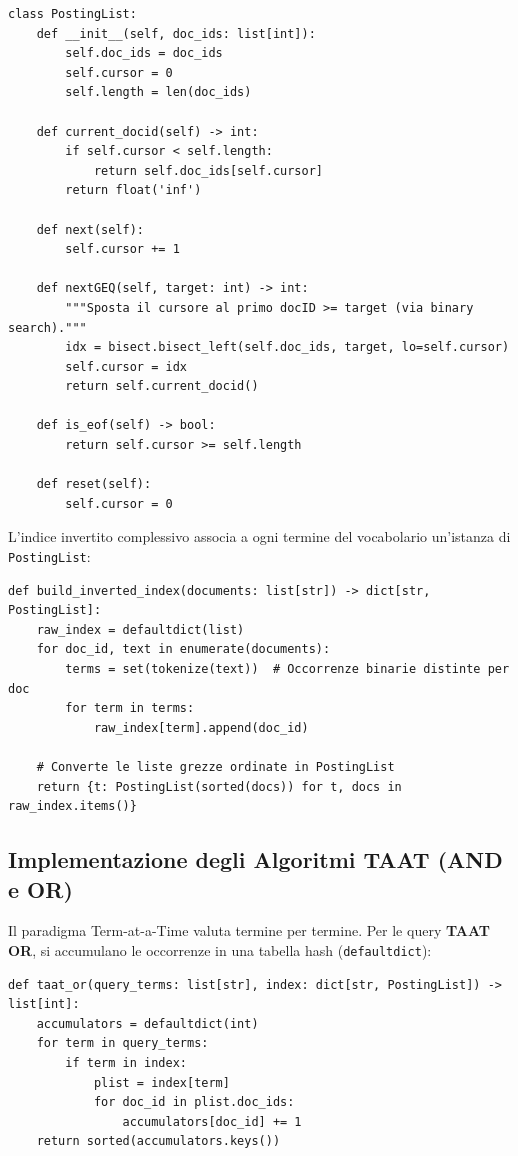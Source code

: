 \begin{lstlisting}[style=pythoncode, caption={Classe `PostingList` con supporto a puntatori e `nextGEQ` via bisezione.}, label={lst:python-posting-list}]
class PostingList:
    def __init__(self, doc_ids: list[int]):
        self.doc_ids = doc_ids
        self.cursor = 0
        self.length = len(doc_ids)

    def current_docid(self) -> int:
        if self.cursor < self.length:
            return self.doc_ids[self.cursor]
        return float('inf')

    def next(self):
        self.cursor += 1

    def nextGEQ(self, target: int) -> int:
        """Sposta il cursore al primo docID >= target (via binary search)."""
        idx = bisect.bisect_left(self.doc_ids, target, lo=self.cursor)
        self.cursor = idx
        return self.current_docid()

    def is_eof(self) -> bool:
        return self.cursor >= self.length

    def reset(self):
        self.cursor = 0
\end{lstlisting}

L'indice invertito complessivo associa a ogni termine del vocabolario un'istanza di \texttt{PostingList}:
\begin{lstlisting}[style=pythoncode, caption={Costruzione dell'indice invertito in memoria.}, label={lst:python-build-index}]
def build_inverted_index(documents: list[str]) -> dict[str, PostingList]:
    raw_index = defaultdict(list)
    for doc_id, text in enumerate(documents):
        terms = set(tokenize(text))  # Occorrenze binarie distinte per doc
        for term in terms:
            raw_index[term].append(doc_id)
            
    # Converte le liste grezze ordinate in PostingList
    return {t: PostingList(sorted(docs)) for t, docs in raw_index.items()}
\end{lstlisting}

\FloatBarrier
\subsection{Implementazione degli Algoritmi TAAT (AND e OR)}
\label{subsec:python-taat-impl}
Il paradigma Term-at-a-Time valuta termine per termine. 
Per le query \textbf{TAAT OR}, si accumulano le occorrenze in una tabella hash (\texttt{defaultdict}):
\begin{lstlisting}[style=pythoncode, caption={Algoritmo TAAT OR in Python con accumulatori hash.}, label={lst:python-taat-or}]
def taat_or(query_terms: list[str], index: dict[str, PostingList]) -> list[int]:
    accumulators = defaultdict(int)
    for term in query_terms:
        if term in index:
            plist = index[term]
            for doc_id in plist.doc_ids:
                accumulators[doc_id] += 1
    return sorted(accumulators.keys())
\end{lstlisting}

